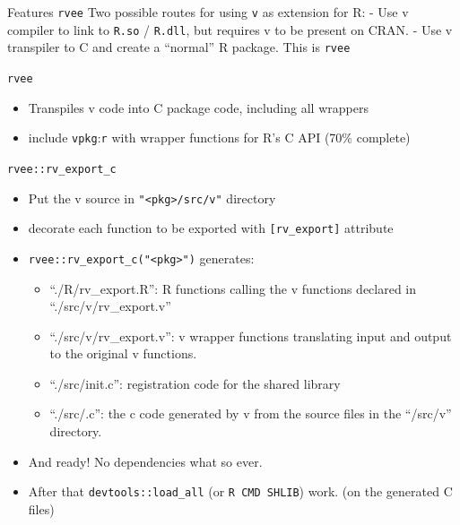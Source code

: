 \documentclass[
  ignorenonframetext,
]{beamer}
\providecommand{\tightlist}{%
  \setlength{\itemsep}{0pt}\setlength{\parskip}{0pt}}
\begin{document}
\begin{frame}[fragile]{Features \texttt{rvee}}
\protect\hypertarget{features-rvee}{}
Two possible routes for using \texttt{v} as extension for R: - Use v
compiler to link to \texttt{R.so} / \texttt{R.dll}, but requires v to be
present on CRAN. - Use v transpiler to C and create a ``normal'' R
package. This is \texttt{rvee}

\begin{block}{\texttt{rvee}}
\protect\hypertarget{rvee}{}
\begin{itemize}
\tightlist
\item
  Transpiles v code into C package code, including all wrappers
\item
  include \texttt{vpkg}:\texttt{r} with wrapper functions for R's C API
  (70\% complete)
\end{itemize}
\end{block}
\end{frame}

\begin{frame}[fragile]{\texttt{rvee::rv\_export\_c}}
\protect\hypertarget{rveerv_export_c}{}
\begin{itemize}
\item
  Put the v source in \texttt{"\textless{}pkg\textgreater{}/src/v"}
  directory
\item
  decorate each function to be exported with \texttt{{[}rv\_export{]}}
  attribute
\item
  \texttt{rvee::rv\_export\_c("\textless{}pkg\textgreater{}")}
  generates:

  \begin{itemize}
  \tightlist
  \item
    ``./R/rv\_export.R'': R functions calling the v functions declared
    in ``./src/v/rv\_export.v''
  \item
    ``./src/v/rv\_export.v'': v wrapper functions translating input and
    output to the original v functions.
  \item
    ``./src/init.c'': registration code for the shared library
  \item
    ``./src/.c'': the c code generated by v from the source files in the
    ``/src/v'' directory.
  \end{itemize}
\item
  And ready! No dependencies what so ever.
\item
  After that \texttt{devtools::load\_all} (or \texttt{R\ CMD\ SHLIB})
  work. (on the generated C files)
\end{itemize}
\end{frame}
\end{document}
